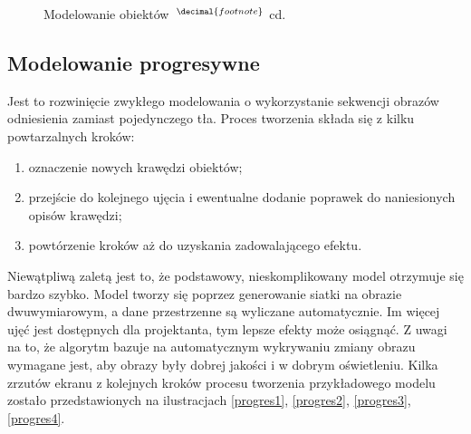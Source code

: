 {\begin{figure}[h]
  \quad
  \label{mo_02}
  \caption[Modelowanie obiektów cd.]{Modelowanie obiektów~$^{\decimal{footnote}}$ cd.}
\end{figure}
 }


\subsection{Modelowanie progresywne}
Jest to rozwinięcie zwykłego modelowania o wykorzystanie sekwencji obrazów
odniesienia zamiast pojedynczego tła. Proces tworzenia składa się z kilku
powtarzalnych kroków:
\begin{enumerate}
  \item oznaczenie nowych krawędzi obiektów;
  \item przejście do kolejnego ujęcia i ewentualne dodanie poprawek do
  naniesionych opisów krawędzi;
  \item powtórzenie kroków aż do uzyskania zadowalającego efektu.
\end{enumerate}

Niewątpliwą zaletą jest to, że podstawowy, nieskomplikowany model otrzymuje się
bardzo szybko. Model tworzy się poprzez generowanie siatki na obrazie
dwuwymiarowym, a dane przestrzenne są wyliczane automatycznie. Im więcej ujęć
jest dostępnych dla projektanta, tym lepsze efekty może osiągnąć. Z uwagi na to,
że algorytm bazuje na automatycznym wykrywaniu zmiany obrazu wymagane jest, aby
obrazy były dobrej jakości i w dobrym oświetleniu.
Kilka zrzutów ekranu z kolejnych kroków procesu tworzenia przykładowego modelu
zostało przedstawionych na ilustracjach \ref{progres1}, \ref{progres2},
\ref{progres3}, \ref{progres4}.

